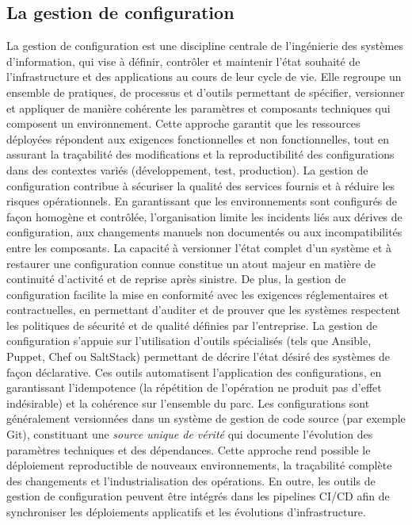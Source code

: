 \subsection{La gestion de configuration}

La gestion de configuration est une discipline centrale de l’ingénierie des systèmes d’information, qui vise à définir, contrôler et maintenir l’état souhaité de l’infrastructure et des applications au cours de leur cycle de vie. Elle regroupe un ensemble de pratiques, de processus et d’outils permettant de spécifier, versionner et appliquer de manière cohérente les paramètres et composants techniques qui composent un environnement. Cette approche garantit que les ressources déployées répondent aux exigences fonctionnelles et non fonctionnelles, tout en assurant la traçabilité des modifications et la reproductibilité des configurations dans des contextes variés (développement, test, production).
La gestion de configuration contribue à sécuriser la qualité des services fournis et à réduire les risques opérationnels. En garantissant que les environnements sont configurés de façon homogène et contrôlée, l’organisation limite les incidents liés aux dérives de configuration, aux changements manuels non documentés ou aux incompatibilités entre les composants. La capacité à versionner l’état complet d’un système et à restaurer une configuration connue constitue un atout majeur en matière de continuité d’activité et de reprise après sinistre. De plus, la gestion de configuration facilite la mise en conformité avec les exigences réglementaires et contractuelles, en permettant d’auditer et de prouver que les systèmes respectent les politiques de sécurité et de qualité définies par l’entreprise.
La gestion de configuration s’appuie sur l’utilisation d’outils spécialisés (tels que Ansible, Puppet, Chef ou SaltStack) permettant de décrire l’état désiré des systèmes de façon déclarative. Ces outils automatisent l’application des configurations, en garantissant l’idempotence (la répétition de l’opération ne produit pas d’effet indésirable) et la cohérence sur l’ensemble du parc. Les configurations sont généralement versionnées dans un système de gestion de code source (par exemple Git), constituant une \textit{source unique de vérité} qui documente l’évolution des paramètres techniques et des dépendances. Cette approche rend possible le déploiement reproductible de nouveaux environnements, la traçabilité complète des changements et l’industrialisation des opérations. En outre, les outils de gestion de configuration peuvent être intégrés dans les pipelines CI/CD afin de synchroniser les déploiements applicatifs et les évolutions d’infrastructure.


